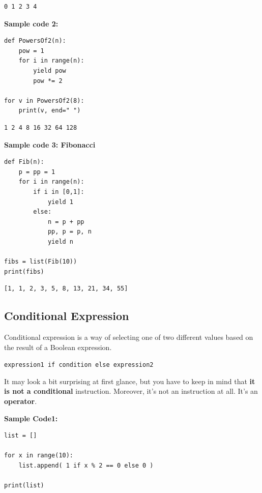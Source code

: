\documentclass[11pt]{article}
\begin{document}
\begin{verbatim}
0 1 2 3 4 
\end{verbatim}


\vspace{10 mm}

\textbf{Sample code 2:} 
\begin{verbatim}
def PowersOf2(n):
	pow = 1
	for i in range(n):
		yield pow
		pow *= 2

for v in PowersOf2(8):
	print(v, end=" ")
\end{verbatim}

\begin{verbatim}
1 2 4 8 16 32 64 128 
\end{verbatim}

\vspace{12 mm}

\textbf{Sample code 3: Fibonacci} 
\begin{verbatim}
def Fib(n):
	p = pp = 1
	for i in range(n):
		if i in [0,1]:
			yield 1
		else:
			n = p + pp
			pp, p = p, n
			yield n

fibs = list(Fib(10))
print(fibs)
\end{verbatim}

\begin{verbatim}
[1, 1, 2, 3, 5, 8, 13, 21, 34, 55]
\end{verbatim}

\newpage

\subsection{Conditional Expression}
\label{sec:org2099492}
Conditional expression is a way of selecting one of two different
values based on the result of a Boolean expression.

\texttt{expression1 if condition else expression2}

It may look a bit surprising at first glance, but you have to keep in
mind that \textbf{it is not a conditional} instruction. Moreover, it’s not an
instruction at all. It’s an \textbf{operator}.

\vspace{10 mm}

\textbf{Sample Code1:}
\begin{verbatim}
list = []

for x in range(10):
	list.append( 1 if x % 2 == 0 else 0 )

print(list)
\end{verbatim}
\end{document}
